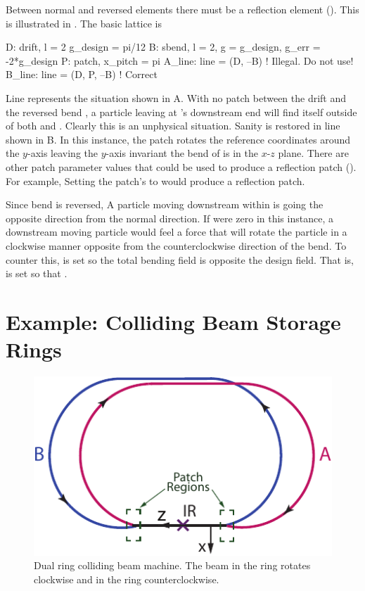 Between normal and reversed elements there must be a reflection
 element ().  This is illustrated in
. The basic lattice is
\begin{example}
  D: drift, l = 2
  g_design = pi/12
  B: sbend, l = 2, g = g_design, g_err = -2*g_design
  P: patch, x_pitch = pi
  A_line: line = (D, --B)     ! Illegal. Do not use!
  B_line: line = (D, P, --B)  ! Correct
\end{example}
Line  represents the situation shown in A.  With no patch between
the drift  and the reversed bend , a particle leaving  at 's downstream end
will find itself outside of both  and . Clearly this is an unphysical situation. Sanity
is restored in line  shown in B. In this instance, the patch 
rotates the reference coordinates around the $y$-axis leaving the $y$-axis invariant the bend of
 is in the $x$-$z$ plane. There are other patch parameter values that could be used to produce
a reflection patch ().  For example, Setting the patch's  to
 would produce a reflection patch.

Since bend  is reversed, A particle moving downstream within  is going the opposite
direction from the normal direction. If  were zero in this instance, a downstream moving
particle would feel a force that will rotate the particle in a clockwise manner opposite from the
counterclockwise direction of the bend. To counter this,  is set so the total bending
field  is opposite the design field. That is,  is set so that
.

\section{Example: Colliding Beam Storage Rings}
\label{s:ex.collide}

\begin{figure}[tb]
  \centering
  \includegraphics[width=5in]{colliding-beams.pdf}
  \caption[Dual ring colliding beam machine]{Dual ring colliding beam machine. 
The beam in the  ring rotates clockwise and in the  ring
counterclockwise.}
  \label{f:collide}
\end{figure}

